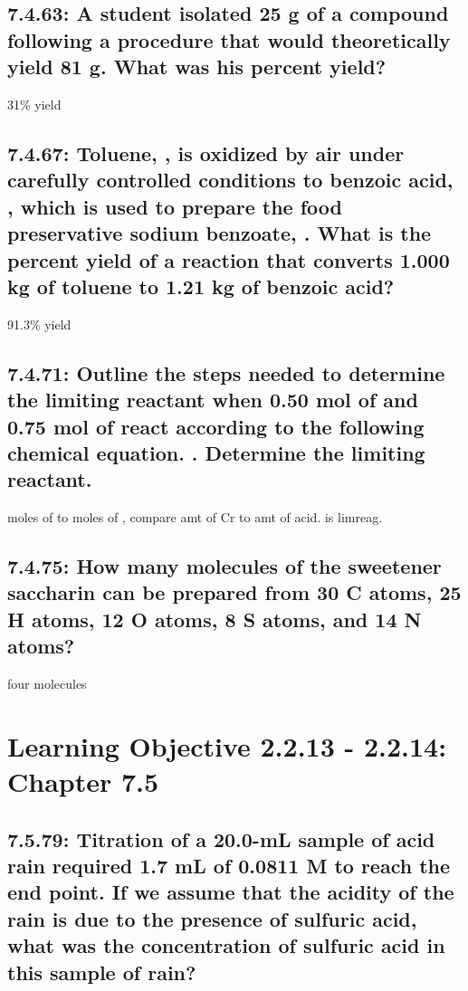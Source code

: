 \documentclass[11pt, letterpaper]{article}
\begin{document}
\subsection*{7.4.63: A student isolated 25 g of a compound following a 
procedure that would theoretically yield 81 g. What was his percent yield?}

31\% yield

\subsection*{7.4.67: Toluene, , is oxidized by air under carefully 
controlled conditions to benzoic acid, , 
which is used to prepare the food preservative sodium benzoate, . 
What is the percent yield of a reaction that converts 1.000 kg of toluene 
to 1.21 kg of benzoic acid?}

91.3\% yield

\subsection*{7.4.71: Outline the steps needed to determine the
limiting reactant when 0.50 mol of  and 0.75 mol of 
react according to the following chemical equation.
.  Determine the limiting reactant.}

moles of  to moles of , compare amt of Cr to amt of acid.
 is limreag.

\subsection*{7.4.75: How many molecules of the sweetener saccharin can 
be prepared from 30 C atoms, 25 H atoms, 12 O atoms, 8 S atoms, and 14 N atoms?}

four molecules

\section*{Learning Objective 2.2.13 - 2.2.14: Chapter 7.5}


\subsection*{7.5.79: Titration of a 20.0-mL sample of acid rain 
required 1.7 mL of 0.0811 M  to reach the end point. 
If we assume that the acidity of the rain is due to the 
presence of sulfuric acid, what was the concentration 
of sulfuric acid in this sample of rain?}
\end{document}
